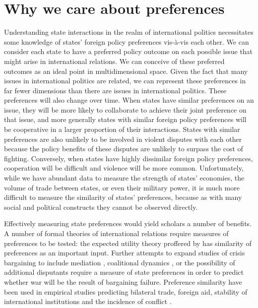 \section*{Why we care about preferences}


Understanding state interactions in the realm of international politics necessitates some knowledge of states' foreign policy preferences vis-\`{a}-vis each other.  We can consider each state to have a preferred policy outcome on each possible issue that might arise in international relations. We can conceive of these preferred outcomes as an ideal point in multidimensional space. Given the fact that many issues in international politics are related, we can represent these preferences in far fewer dimensions than there are issues in international politics. These preferences will also change over time. When states have similar preferences on an issue, they will be more likely to collaborate to achieve their joint preference on that issue, and more generally states with similar foreign policy preferences will be cooperative in a larger proportion of their interactions. States with similar preferences are also unlikely to be involved in violent disputes with each other because the policy benefits of these disputes are unlikely to surpass the cost of fighting. Conversely, when states have highly dissimilar foreign policy preferences, cooperation will be difficult and violence will be more common. Unfortunately, while we have abundant data to measure the strength of states' economies, the volume of trade between states, or even their military power, it is much more difficult to measure the similarity of states' preferences, because as with many social and political constructs they cannot be observed directly.

Effectively measuring state preferences would yield scholars a number of benefits. A number of formal theories of international relations require measures of preferences to be tested: the expected utility theory proffered by \citep{buenodemesquita:1983} has similarity of preferences as an important input. Further attempts to expand studies of crisis bargaining to include mediation \citep{kydd:2003}, coalitional dynamics \citep{wolford:2014}, or the possibility of additional disputants \citep{gallop:2017} require a measure of state preferences in order to predict whether war will be the result of bargaining failure. Preference similarity have been used in empirical studies predicting bilateral trade, foreign aid, stability of international institutions and the incidence of conflict \citep{derouen:heo:2004, stone:2004, gartzke:2007, kastner:2007, braumoeller:2008}. 

